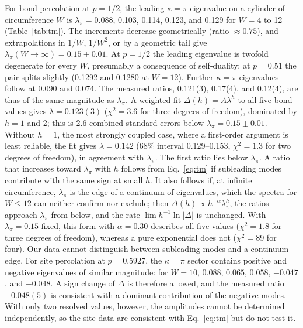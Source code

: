 \documentclass[pre,twocolumn,superscriptaddress,longbibliography,floatfix]{revtex4-2}
\begin{document}
For bond percolation at $p=1/2$, the leading $\kappa=\pi$ eigenvalue on a cylinder of circumference $W$ is $\lambda_\pi=0.088$, 0.103, 0.114, 0.123, and 0.129 for $W=4$ to 12 (Table~\ref{tab:tm}). The increments decrease geometrically (ratio $\approx0.75$), and extrapolations in $1/W$, $1/W^2$, or by a geometric tail give $\lambda_\pi(W\to\infty)=0.15\pm0.01$. At $p=1/2$ the leading eigenvalue is twofold degenerate for every $W$, presumably a consequence of self-duality; at $p=0.51$ the pair splits slightly (0.1292 and 0.1280 at $W=12$). Further $\kappa=\pi$ eigenvalues follow at 0.090 and 0.074. The measured ratios, 0.121(3), 0.17(4), and 0.12(4), are thus of the same magnitude as $\lambda_\pi$. A weighted fit $\Delta(h)=A\lambda^h$ to all five bond values gives $\lambda=0.123(3)$ ($\chi^2=3.6$ for three degrees of freedom), dominated by $h=1$ and 2; this is 2.6 combined standard errors below $\lambda_\pi=0.15\pm0.01$. Without $h=1$, the most strongly coupled case, where a first-order argument is least reliable, the fit gives $\lambda=0.142$ (68\% interval 0.129--0.153, $\chi^2=1.3$ for two degrees of freedom), in agreement with $\lambda_\pi$. The first ratio lies below $\lambda_\pi$. A ratio that increases toward $\lambda_\pi$ with $h$ follows from Eq.~\eqref{eq:tm} if subleading modes contribute with the same sign at small $h$. It also follows if, at infinite circumference, $\lambda_\pi$ is the edge of a continuum of eigenvalues, which the spectra for $W\le12$ can neither confirm nor exclude; then $\Delta(h)\propto h^{-\alpha}\lambda_\pi^h$, the ratios approach $\lambda_\pi$ from below, and the rate $\lim h^{-1}\ln|\Delta|$ is unchanged. With $\lambda_\pi=0.15$ fixed, this form with $\alpha=0.30$ describes all five values ($\chi^2=1.8$ for three degrees of freedom), whereas a pure exponential does not ($\chi^2=89$ for four). Our data cannot distinguish between subleading modes and a continuum edge. For site percolation at $p=0.5927$, the $\kappa=\pi$ sector contains positive and negative eigenvalues of similar magnitude: for $W=10$, $0.088$, $0.065$, $0.058$, $-0.047$, and $-0.048$. A sign change of $\Delta$ is therefore allowed, and the measured ratio $-0.048(5)$ is consistent with a dominant contribution of the negative modes. With only two resolved values, however, the amplitudes cannot be determined independently, so the site data are consistent with Eq.~\eqref{eq:tm} but do not test it.
\end{document}
